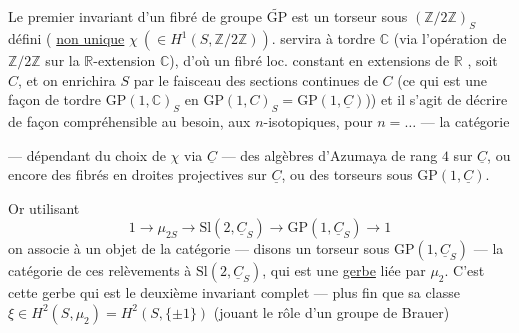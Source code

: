 Le premier invariant d'un fibré de groupe $\widetilde{\mathrm{GP}}$
est un  torseur  sous $(\mathbb Z/2\mathbb Z)_S$
 défini (
\uline{non unique}  $\chi\ (\in H^1(S,\mathbb Z/2\mathbb Z))$.
 servira à tordre $\mathbb C$
(via l'opération  de $\mathbb Z/2\mathbb Z$ sur
la $\mathbb R$-extension $\mathbb C$),  d'où un fibré loc.
constant en  extensions 
de $\mathbb R$ ,
soit $C$, et on  enrichira $S$
par le faisceau  des sections continues de
$C$ (ce qui est une façon de tordre
 $\mathrm{GP}(1,\mathbb C)_S$
en $\mathrm{GP}(1,C)_S=\mathrm{GP}(1,\underline C)$))
et il s'agit de  décrire de façon
compréhensible   au besoin,
aux \deleted{\unsure{$\infty$}}$n$-isotopiques, pour $n=\ldots$ --- la catégorie

--- dépendant du choix de $\chi$ via $\underline C$ --- des
algèbres d'Azumaya de rang $4$ sur $\underline C$,
ou encore des fibrés en droites projectives
sur $\underline C$, ou des torseurs sous $\mathrm{GP}(1,\underline C)$.

Or utilisant  
\[
1\longrightarrow\mu_{2S}\longrightarrow\mathrm{Sl}(2,\underline C_S)
\longrightarrow\mathrm{GP}(1,\underline C_S)\longrightarrow1
\]
on associe à un objet de la catégorie
--- disons un torseur sous $\mathrm{GP}(1,\underline C_S)$ --- la
catégorie  de ces relèvements à
$\mathrm{Sl}(2,\underline C_S)$,
qui est une \uline{gerbe}  liée par $\mu_2$.
C'est cette gerbe qui est le deuxième
invariant complet --- plus fin que
sa classe  
$\xi\in H^2(S,\mu_2)=H^2(S,\{\pm1\})$
(jouant le rôle
d'un groupe de Brauer)

